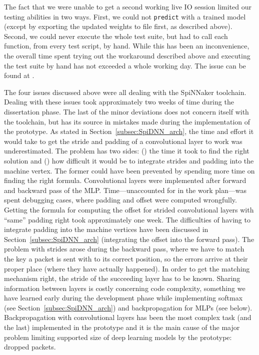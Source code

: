 \documentclass[]{article}
\begin{document}
The fact that we were unable to get a second working live IO session
limited our testing abilities in two ways.
First, we could not \texttt{predict} with a trained model (except by
exporting the updated weights to file first, as described above).
Second, we could never execute the whole test suite, but had to
call each function, from every test script, by hand.
While this has been an inconvenience, the overall time spent trying
out the workaround described above and executing the test
suite by hand has not exceeded a whole working day.
The issue can be found at \citep{fassbender_2020d}.

The four issues discussed above were all dealing with the SpiNNaker
toolchain.
Dealing with these issues took approximately two weeks of time during
the dissertation phase.
The last of the minor deviations does not concern itself with the
toolchain, but has its source in mistakes made during the
implementation of the prototype.
As stated in Section~\ref{subsec:SpiDNN_arch}, the time and effort
it would take to get the stride and padding of a convolutional layer
to work was underestimated.
The problem has two sides: () the time it took to find
the right solution and () how difficult it would be
to integrate strides and padding into the machine vertex.
The former could have been prevented by spending more time
on finding the right formula.
Convolutional layers were implemented after forward and backward pass
of the MLP.
Time---unaccounted for in the work plan---was spent debugging cases,
where padding and offset were computed wrongfully.
Getting the formula for computing the offset for strided convolutional
layers with ``same'' padding right took approximately one week.
The difficulties of having to integrate padding into the machine
vertices have been discussed in Section~\ref{subsec:SpiDNN_arch}
(integrating the offset into the forward pass).
The problem with strides arose during the backward pass, where we
have to match the key a packet is sent with to its correct position,
so the errors arrive at their proper place (where they have actually
happened).
In order to get the matching mechanism right, the stride of the
succeeding layer has to be known.
Sharing information between layers is costly concerning code
complexity, something we have learned early during the development
phase while implementing softmax (see
Section~\ref{subsec:SpiDNN_arch}) and backpropagation for MLPs (see
below).
Backpropagation with convolutional layers has been the most complex
task (and the last) implemented in the prototype and it is the main
cause of the major problem limiting supported size of deep learning
models by the prototype: dropped packets.
\end{document}
